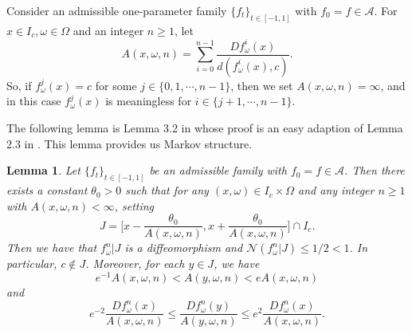 \documentclass[11pt,oneside]{article}
\theoremstyle{plain}
\newtheorem{lem}{Lemma}[section]
\newtheorem{fact}{Fact}[section]
\numberwithin{equation}{section}
\numberwithin{figure}{section}
\numberwithin{table}{section}
\begin{document}
Consider an admissible one-parameter family $\{f_t \}_{t \in [-1, 1]}$ with $f_0 =f \in \mathcal A$. For $x \in I_c, \omega \in \Omega$ and an integer $n \geq 1$, let 
\[
A(x, \omega, n) = \sum_{i=0}^{n-1} \frac{Df_{\omega}^i(x)}{d(f_{\omega}^i(x), c)}.
\]
So, if $f_{\omega}^j (x) = c$ for some $j \in \{ 0, 1, \cdots, n-1 \}$, then we set $A(x, \omega, n) = \infty$, and in this case $f_{\omega}^j(x)$ is meaningless for $i \in \{ j+1, \cdots, n-1 \}$.


The following lemma is Lemma 3.2 in \cite{LR} whose proof is an easy adaption of Lemma 2.3 in \cite{S}. This lemma provides us Markov structure.

\begin{lem}
Let $\{f_t \}_{t \in [-1, 1]} $ be an admissible family with $f_0 =f \in \mathcal A$. Then there exists a constant $\theta_0 >0$ such that for any $(x, \omega) \in I_c \times \Omega$ and any integer $n \geq 1$ with $A(x, \omega, n) < \infty$, setting 
\[
J = \bigg[ x - \frac{\theta_0}{A(x, \omega, n)}, x + \frac{\theta_0}{A(x, \omega, n)} \bigg] \cap I_c.
\]
Then we have that $f_{\omega}^n |J$ is a diffeomorphism and $\mathcal N (f_{\omega}^n | J) \leq 1/2 < 1$. In particular, $c \notin J$. Moreover, for each $y \in J$, we have 
\begin{equation}
e^{-1} A(x, \omega, n) <A(y, \omega, n) < e A(x, \omega, n)
\end{equation}
and
\begin{equation}
e^{-2} \frac{Df_{\omega}^n(x)}{ A(x, \omega, n)} \leq \frac{Df_{\omega}^n(y)}{A(y, \omega, n)} \leq e^2 \frac{ Df_{\omega}^n(x)}{A(x, \omega, n)}.
\end{equation}
\end{lem}
\end{document}
